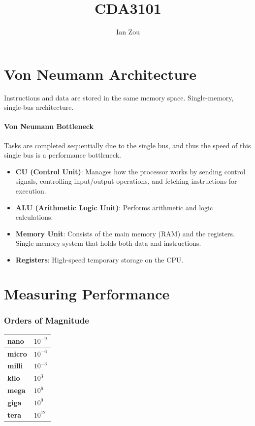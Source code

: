 \documentclass[12pt, letterpaper]{article}
\title{CDA3101}
\author{Ian Zou}
\begin{document}
\maketitle

\part*{Von Neumann Architecture}

Instructions and data are stored in the same memory space.
Single-memory, single-bus architecture.

\subsection*{Von Neumann Bottleneck}

Tasks are completed sequentially due to the single bus, and thus the
speed of this single bus is a performance bottleneck.

\begin{itemize}
  \item \textbf{CU (Control Unit)}: Manages how the processor works
    by sending control signals, controlling input/output operations,
    and fetching instructions for execution.
  \item \textbf{ALU (Arithmetic Logic Unit)}: Performs arithmetic and
    logic calculations.
  \item \textbf{Memory Unit}: Consists of the main memory (RAM) and
    the registers. Single-memory system that holds both data and instructions.
  \item \textbf{Registers}: High-speed temporary storage on the CPU.
\end{itemize}

\part*{Measuring Performance}

\section*{Orders of Magnitude}
\begin{table}[h]
  \begin{center}
    \begin{tabular}{|p{2cm}|p{3cm}|}
      \hline
      \textbf{nano} & $ 10^{-9} $ \\
      \hline
      \textbf{micro} & $ 10^{-6} $ \\
      \hline
      \textbf{milli} & $ 10^{-3} $ \\
      \hline
      \textbf{kilo} & $ 10^3 $ \\
      \hline
      \textbf{mega} & $ 10^6 $ \\
      \hline
      \textbf{giga} & $ 10^9 $ \\
      \hline
      \textbf{tera} & $ 10^{12} $ \\
      \hline
    \end{tabular}
  \end{center}
\end{table}
\FloatBarrier
\end{document}
